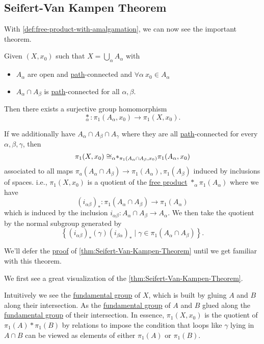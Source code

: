 \subsection{Seifert-Van Kampen Theorem}
With \autoref{def:free-product-with-amalgamation}, we can now see the important theorem.
\begin{theorem}\label{thm:Seifert-Van-Kampen-Theorem}
	Given \((X, x_0)\) such that \(X = \bigcup\limits_{\alpha } A_{\alpha }\) with
	\begin{itemize}
		\item \(A_{\alpha }\) are open and \hyperref[def:path]{path}-connected and \(\forall \alpha \ x_0\in A_{\alpha }\)
		\item \(A_{\alpha }\cap A_{\beta }\) is \hyperref[def:path]{path}-connected for all \(\alpha, \beta  \).
	\end{itemize}
	Then there exists a surjective group homomorphism
	\[
		\underset{\alpha }{\ast}\colon \pi _1(A_{\alpha }, x_0)\to \pi _1(X, x_0).
	\]

	\par If we additionally have \(A_{\alpha }\cap A_{\beta}\cap A_{\gamma}\) where they are all \hyperref[def:path]{path}-connected for every \(\alpha , \beta , \gamma\), then
	\[
		\pi _1(X, x_0)\cong _{\alpha }\hspace{-0.3em}\ast_{\pi _1(A_{\alpha }\cap A_{\beta }, x_0)}{}\pi _1(A_{\alpha }, x_0)
	\]
	associated to all maps \(\pi _a(A_{\alpha }\cap A_{\beta }) \to \pi _1 (A_{\alpha }), \pi _1(A_{\beta })\) induced by inclusions of spaces. i.e., \(\pi _1(X, x_0)\)
	is a quotient of the \hyperref[def:free-product-with-amalgamation]{free product} \(\ast_{\alpha}\pi _1(A_{\alpha })\) where we have
	\[
		(i_{\alpha \beta })_\ast\colon \pi _1(A_{\alpha }\cap A_{\beta })\to \pi _1(A_\alpha )
	\]
	which is induced by the inclusion \(i_{\alpha \beta }\colon A_{\alpha}\cap A_{\beta }\to A_{\alpha }\). We then take the quotient by the normal subgroup generated by
	\[
		\left\{(i_{\alpha \beta })_{\ast}(\gamma)(i_{\beta \alpha })_{\ast} \mid \gamma\in \pi _1(A_{\alpha }\cap A_{\beta })\right\}.
	\]
\end{theorem}
We'll defer the \hyperref[pf:thm:Seifert-Van-Kampen-Theorem]{proof} of \autoref{thm:Seifert-Van-Kampen-Theorem} until we get familiar with this theorem.
\begin{eg}
	We first see a great visualization of the \autoref{thm:Seifert-Van-Kampen-Theorem}.
	\begin{figure}[H]
		\centering
		\label{fig:eg:Seifert-Van-Kampen-Theorem}
	\end{figure}
	Intuitively we see the \hyperref[def:fundamental-group]{fundamental group} of \(X\), which is built by gluing \(A\) and \(B\) along their intersection.
	As the \hyperref[def:fundamental-group]{fundamental group} of \(A\) and \(B\) glued along the \hyperref[def:fundamental-group]{fundamental group} of their
	intersection. In essence, \(\pi _1 (X, x_0)\) is the quotient of \(\pi _1(A)\ast \pi _1(B)\) by relations to impose the condition that loops like \(\gamma \)
	lying in \(A\cap B\) can be viewed as elements of either \(\pi _1(A)\) or \(\pi _1(B)\).
\end{eg}

